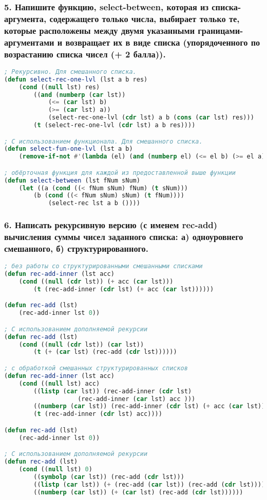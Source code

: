 \subsubsection*{5. Напишите функцию, select-between, которая из списка-аргумента, содержащего только числа, выбирает только те, которые расположены между двумя указанными границами-аргументами и возвращает их в виде списка (упорядоченного по возрастанию списка чисел (+ 2 балла)).}
\begin{lstlisting}[language=Lisp]
; Рекурсивно. Для смешанного списка.	
(defun select-rec-one-lvl (lst a b res)
	(cond ((null lst) res)
		((and (numberp (car lst)) 
			(<= (car lst) b) 
			(>= (car lst) a)) 
			(select-rec-one-lvl (cdr lst) a b (cons (car lst) res)))
		(t (select-rec-one-lvl (cdr lst) a b res))))

; С использованием функционала. Для смешанного списка.
(defun select-fun-one-lvl (lst a b)
	(remove-if-not #'(lambda (el) (and (numberp el) (<= el b) (>= el a))) lst))

; обёрточная функция для каждой из предоставленной выше функции
(defun select-between (lst fNum sNum)
	(let ((a (cond ((< fNum sNum) fNum) (t sNum)))
		(b (cond ((< fNum sNum) sNum) (t fNum))))
			(select-rec lst a b ()))) 
\end{lstlisting}

\newpage
\subsubsection*{6.  Написать рекурсивную версию (с именем rec-add) вычисления суммы чисел заданного списка: \newline а) одноуровнего смешанного, \newline б) структурированного.}
\begin{lstlisting}[language=Lisp]
; без работы со структурированными смешанными списками
(defun rec-add-inner (lst acc)
	(cond ((null (cdr lst)) (+ acc (car lst)))
		(t (rec-add-inner (cdr lst) (+ acc (car lst))))))

(defun rec-add (lst)
	(rec-add-inner lst 0))

; С использованием дополняемой рекурсии
(defun rec-add (lst)
	(cond ((null (cdr lst)) (car lst))
		(t (+ (car lst) (rec-add (cdr lst))))))

; с обработкой смешанных структурированных списков
(defun rec-add-inner (lst acc)
	(cond ((null lst) acc)
		((listp (car lst)) (rec-add-inner (cdr lst) 
					(rec-add-inner (car lst) acc )))
		((numberp (car lst)) (rec-add-inner (cdr lst) (+ acc (car lst))))
		(t (rec-add-inner (cdr lst) acc))))

(defun rec-add (lst)
	(rec-add-inner lst 0))

; С использованием дополняемой рекурсии
(defun rec-add (lst)
	(cond ((null lst) 0)
		((symbolp (car lst)) (rec-add (cdr lst)))
		((listp (car lst)) (+ (rec-add (car lst)) (rec-add (cdr lst))))
		((numberp (car lst)) (+ (car lst) (rec-add (cdr lst))))))
\end{lstlisting}

